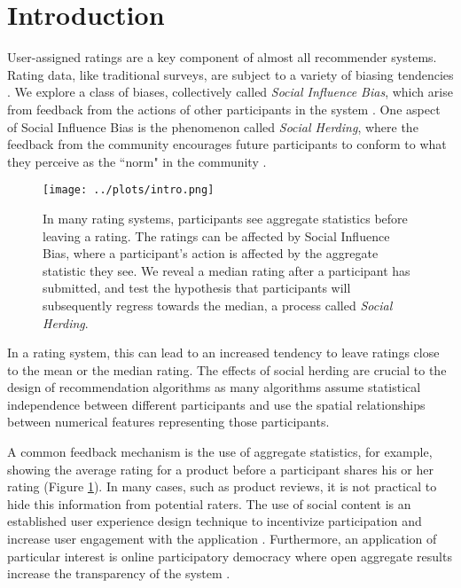 \section{Introduction}
User-assigned ratings are a key component of almost all recommender systems.
Rating data, like traditional surveys, are subject to a variety of biasing tendencies \cite{groves2013survey}.
We explore a class of biases, collectively called \emph{Social Influence Bias}, which arise from feedback from the actions of other participants in the system \cite{demarzo2003persuasion, moscovici1972social, wood2000attitude}.
One aspect of Social Influence Bias is the phenomenon called \emph{Social Herding}, where the feedback from the community encourages future participants to conform to what they perceive as the ``norm" in the community \cite{banerjee1992simple}. 
\begin{figure}[t]
  \centering
    \texttt{[image: ../plots/intro.png]}
      \caption{In many rating systems, participants see aggregate statistics before leaving a rating. The ratings can be affected by Social Influence Bias, where a participant's action is affected by the aggregate statistic they see. We reveal a median rating after a participant has submitted, and test the hypothesis that participants will subsequently regress towards the median, a process called \emph{Social Herding}.}
      \label{grading-0}
\end{figure}
In a rating system, this can lead to an increased tendency to leave ratings close to the mean or the median rating. 
The effects of social herding are crucial to the design of recommendation algorithms as many algorithms assume statistical independence between different participants and use the spatial relationships between numerical features representing those participants.

A common feedback mechanism is the use of aggregate statistics, for example, showing the average rating for a product before a participant shares his or her rating (Figure \ref{grading-0}).
In many cases, such as product reviews, it is not practical to hide this information from potential raters.
The use of social content is an established user experience design technique to incentivize participation and increase user engagement with the application \cite{shneiderman1992designing}.
Furthermore, an application of particular interest is online participatory democracy where open aggregate results increase the transparency of the system \cite{albors2008new,o2012transparency,noveck2008wiki}.

